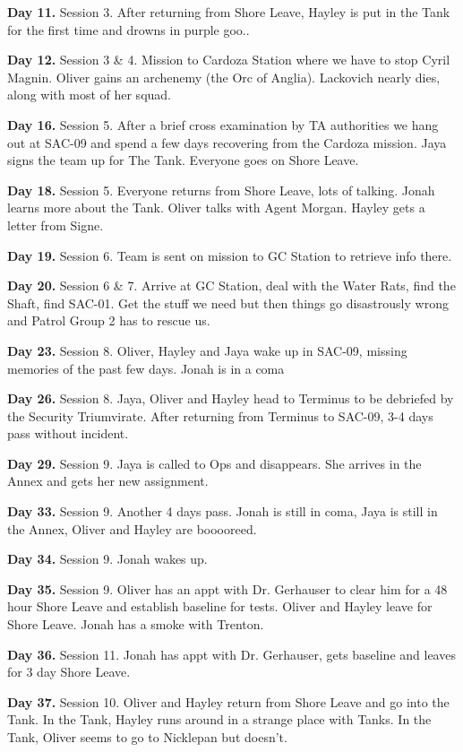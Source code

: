 \textbf{Day 11.} Session 3. After returning from Shore Leave, Hayley is put in the Tank for the first time and drowns in purple goo..

\textbf{Day 12.} Session 3 \& 4. Mission to Cardoza Station where we have to stop Cyril Magnin.  Oliver gains an archenemy (the Orc of Anglia).  Lackovich nearly dies, along with most of her squad. 

\textbf{Day 16.} Session 5. After a brief cross examination by TA authorities we hang out at SAC-09 and spend a few days recovering from the Cardoza mission. Jaya signs the team up for The Tank.  Everyone goes on Shore Leave.

\textbf{Day 18. }Session 5.  Everyone returns from Shore Leave, lots of talking.  Jonah learns more about the Tank.  Oliver talks with Agent Morgan.  Hayley gets a letter from Signe.

\textbf{Day 19. }Session 6.  Team is sent on mission to GC Station to retrieve info there.

\textbf{Day 20. }Session 6 \& 7. Arrive at GC Station, deal with the Water Rats, find the Shaft, find SAC-01. Get the stuff we need but then things go disastrously wrong and Patrol Group 2 has to rescue us.

\textbf{Day 23.} Session 8. Oliver, Hayley and Jaya wake up in SAC-09, missing memories of the past few days. Jonah is in a coma

\textbf{Day 26.} Session 8. Jaya, Oliver and Hayley head to Terminus to be debriefed by the Security Triumvirate. After returning from Terminus to SAC-09, 3-4 days pass without incident.

\textbf{Day 29.} Session 9.  Jaya is called to Ops and disappears.  She arrives in the Annex and gets her new assignment.

\textbf{Day 33.} Session 9. Another 4 days pass.  Jonah is still in coma, Jaya is still in the Annex, Oliver and Hayley are booooreed.

\textbf{Day 34.} Session 9. Jonah wakes up.

\textbf{Day 35.} Session 9. Oliver has an appt with Dr. Gerhauser to clear him for a 48 hour Shore Leave and establish baseline for tests.  Oliver and Hayley leave for Shore Leave.  Jonah has a smoke with Trenton.

\textbf{Day 36.} Session 11. Jonah has appt with Dr. Gerhauser, gets baseline and leaves for 3 day Shore Leave.

\textbf{Day 37.} Session 10. Oliver and Hayley return from Shore Leave and go into the Tank.  In the Tank, Hayley runs around in a strange place with Tanks.  In the Tank, Oliver seems to go to Nicklepan but doesn't.

